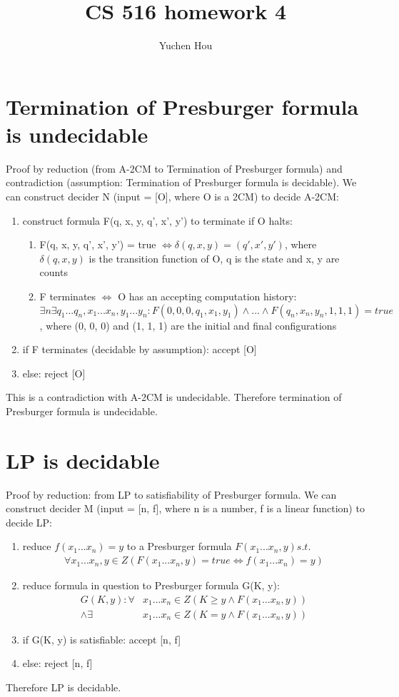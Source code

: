 \documentclass{article}
\begin{document}
\lstset{language=python, tabsize=4}
\title{CS 516 homework 4}
\author{Yuchen Hou}
\maketitle

\section{Termination of Presburger formula is undecidable}
Proof by reduction (from A-2CM to Termination of Presburger formula) and 
contradiction (assumption: Termination of Presburger formula is decidable).
We can construct decider N (input = [O], where O is a 2CM) to decide A-2CM:
\begin{enumerate}
	\item construct formula F(q, x, y, q', x', y') to terminate if O halts:
	\begin{enumerate}
		\item F(q, x, y, q', x', y') = true $ \iff \delta(q, x, y) = (q', x', 
		y') $, where $ \delta(q, x, y) $ is the transition function of O, q is 
		the state and x, y are counts
		\item F terminates $ \iff $ O has an accepting computation history: $ 
		\exists n \exists q_1 ... q_n, x_1 ... x_n, y_1 ... y_n : F(0, 0, 0, 
		q_1, x_1, y_1) \land ... \land F(q_n, x_n, y_n, 1, 1, 1) = true$, where 
		(0, 0, 0) and (1, 1, 1) are the initial and final configurations
	\end{enumerate}
	\item if F terminates (decidable by assumption): accept [O]
	\item else: reject [O]
\end{enumerate}
This is a contradiction with A-2CM is undecidable. Therefore termination of 
Presburger formula is undecidable.

\section{LP is decidable}
Proof by reduction: from LP to satisfiability of Presburger formula.
We can construct decider M (input = [n, f], where n is a number, 
f is a linear function) to decide LP:
\begin{enumerate}
	\item reduce $ f(x_1...x_n) = y $ to a Presburger formula $ F(x_1...x_n, y) 
	s.t. $
	\begin{align*}
		\forall x_1...x_n, y \in Z (F(x_1...x_n,y) = true \iff f(x_1...x_n) =y)
	\end{align*}
	\item reduce formula in question to Presburger formula G(K, y):
	\begin{align*}
		G(K, y): \forall& x_1 ... x_n \in Z(K \ge y \land F(x_1 ... x_n, y)) \\
		\land \exists& x_1 ... x_n \in Z (K = y \land F(x_1 ... x_n, y))
	\end{align*}
	\item if G(K, y) is satisfiable: accept [n, f]
	\item else: reject [n, f]
\end{enumerate}
Therefore LP is decidable.
\end{document}

